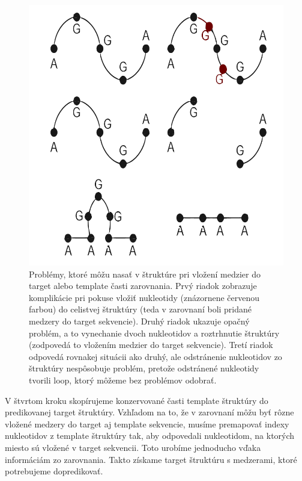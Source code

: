 \begin{figure}%
\includegraphics[width=\textwidth]{../img/aln-problems}
\caption{Problémy, ktoré môžu nasať v štruktúre pri vložení medzier do target alebo template časti zarovnania. Prvý riadok zobrazuje komplikácie pri pokuse vložiť nukleotidy (znázornene červenou farbou) do celistvej štruktúry (teda v zarovnaní boli pridané medzery do target sekvencie). Druhý riadok ukazuje opačný problém, a to vynechanie dvoch nukleotidov a roztrhnutie štruktúry (zodpovedá to vložením medzier do target sekvencie). Tretí riadok odpovedá rovnakej situácii ako druhý, ale odstránenie nukleotidov zo štruktúry nespôsobuje problém, pretože odstránené nukleotidy tvorili loop, ktorý môžeme bez problémov odobrať.}
\label{obr3.1:indels}
\end{figure}



\indent V štvrtom kroku skopírujeme konzervované časti template štruktúry do predikovanej target štruktúry. Vzhľadom na to, že v zarovnaní môžu byť rôzne vložené medzery do target aj template sekvencie, musíme premapovať indexy nukleotidov z template štruktúry tak, aby odpovedali nukleotidom, na ktorých miesto sú vložené v target sekvencii. Toto urobíme jednoducho vďaka informáciám zo zarovnania. Takto získame target štruktúru s medzerami, ktoré potrebujeme dopredikovať.


